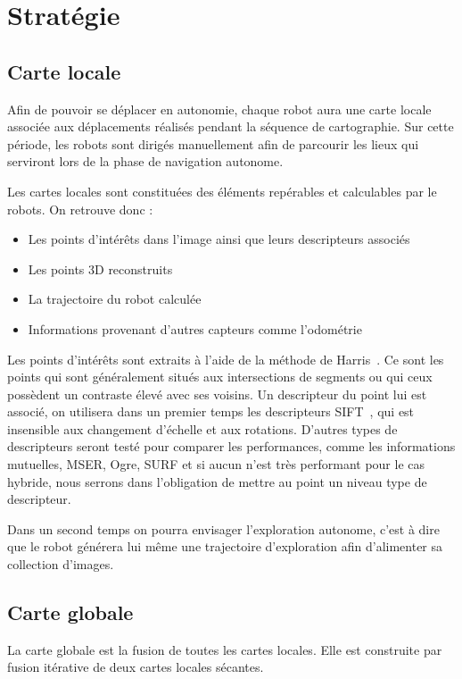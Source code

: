 \section{Stratégie}
\label{sec:strategie}

\subsection{Carte locale}

Afin de pouvoir se déplacer en autonomie, chaque robot aura une carte locale associée aux déplacements réalisés pendant la séquence de cartographie.
Sur cette période, les robots sont dirigés manuellement afin de parcourir les lieux qui serviront lors de la phase de navigation autonome.

Les cartes locales sont constituées des éléments repérables et calculables par le robots.
On retrouve donc :
\begin{itemize}
\item Les points d'intérêts dans l'image ainsi que leurs descripteurs associés
\item Les points 3D reconstruits
\item La trajectoire du robot calculée
\item Informations provenant d'autres capteurs comme l'odométrie
\end{itemize}

Les points d'intérêts sont extraits à l'aide de la méthode de Harris~\cite{Harris88}. Ce sont les points qui sont généralement situés aux intersections de segments ou qui ceux possèdent un contraste élevé avec ses voisins.
Un descripteur du point lui est associé, on utilisera dans un premier temps les descripteurs SIFT~\cite{Lowe99}, qui est insensible aux changement d'échelle et aux rotations.
D'autres types de descripteurs seront testé pour comparer les performances, comme les informations mutuelles, MSER, Ogre, SURF et si aucun n'est très performant pour le cas hybride, nous serrons dans l'obligation de mettre au point un niveau type de descripteur.

Dans un second temps on pourra envisager l'exploration autonome, c'est à dire que le robot générera lui même une trajectoire d'exploration afin d'alimenter sa collection d'images.

\subsection{Carte globale}

La carte globale est la fusion de toutes les cartes locales.
Elle est construite par fusion itérative de deux cartes locales sécantes.

